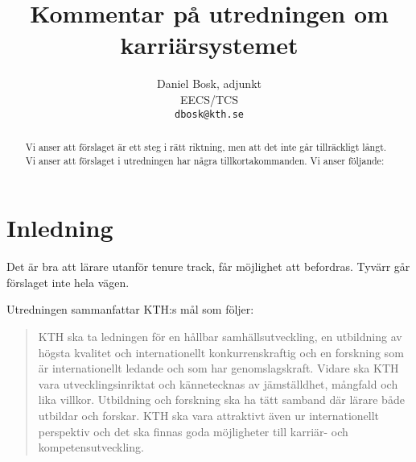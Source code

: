 \documentclass[a4paper,oneside,article,swedish]{memoir}
\title{Kommentar på utredningen om karriärsystemet}
\author{%
  Daniel Bosk, adjunkt\\EECS/TCS\\\texttt{dbosk@kth.se}
}
\let\section\chapter
\begin{document}
\maketitle
\begin{abstract}
  Vi anser att förslaget är ett steg i rätt riktning, men att det inte går 
  tillräckligt långt.
  Vi anser att förslaget i utredningen har några tillkortakommanden.
  Vi anser följande:
  
\end{abstract}
\clearpage
\tableofcontents*
\clearpage


\section{Inledning}

Det är bra att lärare utanför tenure track, får möjlighet att befordras.
Tyvärr går förslaget inte hela vägen.

Utredningen\autocite{utredning} sammanfattar KTH:s mål som följer:
\blockcquote[s.~2]{utredning}{%
  KTH ska ta ledningen för en hållbar samhällsutveckling, en utbildning av 
  högsta kvalitet och internationellt konkurrenskraftig och en forskning som 
  är internationellt ledande och som har genomslagskraft.
  Vidare ska KTH vara utvecklingsinriktat och kännetecknas av jämställdhet, 
  mångfald och lika villkor.
  Utbildning och forskning ska ha tätt samband där lärare både utbildar och 
  forskar.
  KTH ska vara attraktivt även ur internationellt perspektiv och det ska 
  finnas goda möjligheter till karriär- och kompetensutveckling.%
}
\end{document}

